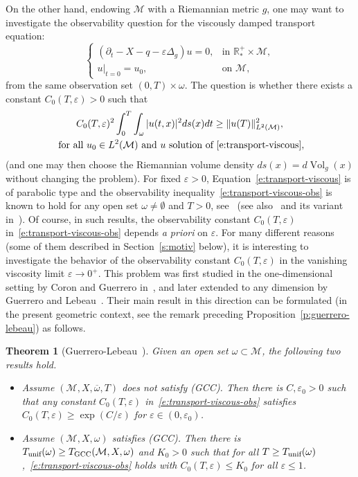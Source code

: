 \documentclass[10pt]{amsart}
\newcommand{\GCC}{\textup{GCC}}
\newcommand{\pGCC}{\textup{(GCC)}\xspace}
\newcommand{\unif}{\textup{unif}}
\newtheorem{theorem}[lemma]{Theorem}
\theoremstyle{definition}
\newcommand{\M}{\ensuremath{\mathcal M}}
\newcommand{\mb}[1]{\ensuremath{\mathbb{#1}}}
\newcommand{\R}{{\mb{R}}}
\DeclareMathOperator{\Vol}{Vol}
\let\d\partial
\let\eps\varepsilon
\let\q q
\begin{document}
On the other hand, endowing $\M$ with a Riemannian metric $g$, one may want to investigate the observability question for the viscously damped transport equation:
\begin{equation}
\label{e:transport-viscous}
\begin{cases}
(\d_t - X -\q - \eps \Delta_g ) u = 0, & \text{in } \R^+_*\times \M, \\
u|_{t=0} = u_0, & \text{on } \M,
\end{cases}
\end{equation}
from the same observation set $(0,T)\times\omega$. The question is whether there exists a constant $C_0(T,\eps)>0$ such that
\begin{multline}
\label{e:transport-viscous-obs}
C_0(T,\eps)^2 \int_0^T\int_\omega |u(t,x)|^2 ds(x)dt \geq \|u (T)\|_{L^2(\M)}^2, \\
\text{ for all } u_0 \in L^2(\M) \text{ and } u \text{ solution of~\eqref{e:transport-viscous}},
\end{multline}
(and one may then choose the Riemannian volume density $ds(x) = d\Vol_g(x)$ without changing the problem).
For fixed $\eps>0$, Equation~\eqref{e:transport-viscous} is of parabolic type and the observability inequality~\eqref{e:transport-viscous-obs} is known to hold for any open set $\omega \neq \emptyset$ and $T>0$, see~\cite{FI:96} (see also~\cite{LR:95} and its variant in~\cite{Lea:10}).
Of course, in such results, the observability constant $C_0(T,\eps)$ in~\eqref{e:transport-viscous-obs} depends {\em a priori} on $\eps$.
For many different reasons (some of them described in Section~\ref{s:motiv} below), it is interesting to investigate the behavior of the observability constant $C_0(T,\eps)$ in the vanishing viscosity limit $\eps \to 0^+$. This problem was first studied in the one-dimensional setting by Coron and Guerrero in~\cite{CG:05}, and later extended to any dimension by Guerrero and Lebeau~\cite{GL:07}. Their main result in this direction can be formulated (in the present geometric context, see the remark preceding Proposition~\ref{p:guerrero-lebeau}) as follows.
\begin{theorem}[Guerrero-Lebeau~\cite{GL:07}]
\label{t:Leb-Guer}
Given an open set $\omega \subset \M$, the following two results hold.
\begin{itemize}
\item \cite[Th.\,1]{GL:07} Assume $(\M,X,\overline{\omega}, T)$ does not satisfy \pGCC. Then there is \hbox{$C, \eps_0>0$} such that any constant $C_0(T,\eps)$ in~\eqref{e:transport-viscous-obs} satisfies $C_0(T,\eps)\geq \exp(C/\eps)$ for $\eps \in (0,\eps_0)$.
\item \cite[Th.\,3]{GL:07} Assume $(\M,X,\omega)$ satisfies \pGCC. Then there is $T_{\unif}(\omega) \geq T_{\GCC}(\M,X,\omega)$ and $K_0>0$ such that for all $T\geq T_{\unif}(\omega)$,~\eqref{e:transport-viscous-obs} holds with $C_0(T,\eps)\leq K_0$ for all $\eps \leq 1$.
\end{itemize}
\end{theorem}
\end{document}
